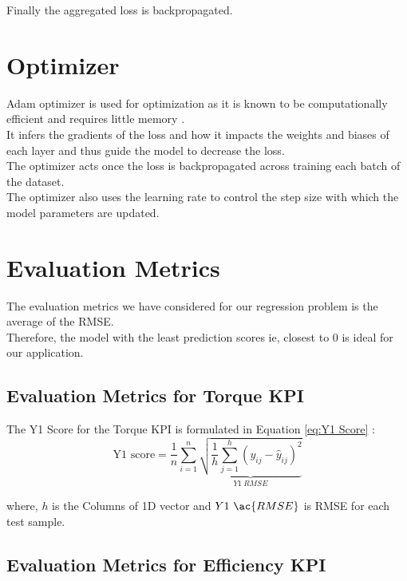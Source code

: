\documentclass{report} %
\begin{document}
Finally the aggregated loss is backpropagated.\\
\vspace{0.2cm} %

\section{Optimizer}\label{sec:Optimizer}

Adam optimizer is used for optimization as it is known to be computationally efficient and requires little memory \cite{ADAM-2017}. \\
It infers the gradients of the loss and how it impacts the weights and biases of each layer and thus guide the model to decrease the loss. \\
The optimizer acts once the loss is backpropagated across training each batch of the dataset.\\
The optimizer also uses the learning rate to control the step size with which the model parameters are updated.\\

\section{Evaluation Metrics}

The evaluation metrics we have considered for our regression problem is the average of the \ac{RMSE}. \\
Therefore, the model with the least prediction scores ie, closest to 0 is ideal for our application. \\

\subsection{Evaluation Metrics for Torque \ac{KPI}}\label{sec:Evaluation Metrics for 2D KPI}

The Y1 Score for the Torque \ac{KPI} is formulated in Equation \ref{eq:Y1 Score} :
\begin{equation}
\text{Y1 score} = \frac{1}{n} \sum_{i=1}^{n} \underbrace{ \sqrt{\frac{1}{h} \sum_{j=1}^{h} (y_{ij} - \hat{y}_{ij})^2}}_{Y1\ RMSE}
\label{eq:Y1 Score}
\end{equation}

where, \(h\) is the Columns of 1D vector and \(Y1\ \ac{RMSE}\) is \ac{RMSE} for each test sample.

\subsection{Evaluation Metrics for Efficiency \ac{KPI}}\label{sec:Evaluation Metrics for 3D KPI}
\end{document}
